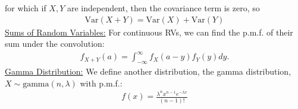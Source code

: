 \documentclass{article}
\newcommand{\sheader}[1]{\underline{#1:}}
\begin{document}
for which if $X, Y$ are independent, then the covariance term is zero, so
\begin{align*}
    \textrm{Var}(X + Y) = \textrm{Var}(X) + \textrm{Var}(Y)
\end{align*}
\sheader{Sums of Random Variables} For continuous RVs, we can find the
p.m.f. of their sum under the convolution:
\begin{align*}
    f_{X + Y}(a) = \int_{-\infty}^{\infty} f_X(a-y)f_Y(y)dy.
\end{align*}
\sheader{Gamma Distribution} We define another distribution, the gamma distribution, $X \sim \textrm{gamma}(n, \lambda)$ with 
p.m.f.:
\begin{align*}
    f(x) = \frac{\lambda^n x^{n - 1} e^{-\lambda x}}{(n - 1)!}
\end{align*}
\end{document}
